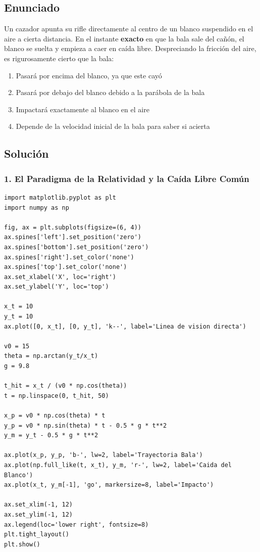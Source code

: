 \documentclass[12pt, a4paper]{article}
\begin{document}
\subsection*{Enunciado}
Un cazador apunta su rifle directamente al centro de un blanco suspendido en el aire a cierta distancia. En el instante \textbf{exacto} en que la bala sale del cañón, el blanco se suelta y empieza a caer en caída libre. Despreciando la fricción del aire, es rigurosamente cierto que la bala:
\begin{enumerate}[label=\alph*)]
    \item Pasará por encima del blanco, ya que este cayó
    \item Pasará por debajo del blanco debido a la parábola de la bala
    \item Impactará exactamente al blanco en el aire
    \item Depende de la velocidad inicial de la bala para saber si acierta
\end{enumerate}

\subsection*{Solución}

\subsubsection*{1. El Paradigma de la Relatividad y la Caída Libre Común}

\begin{verbatim}
import matplotlib.pyplot as plt
import numpy as np

fig, ax = plt.subplots(figsize=(6, 4))
ax.spines['left'].set_position('zero')
ax.spines['bottom'].set_position('zero')
ax.spines['right'].set_color('none')
ax.spines['top'].set_color('none')
ax.set_xlabel('X', loc='right')
ax.set_ylabel('Y', loc='top')

x_t = 10
y_t = 10
ax.plot([0, x_t], [0, y_t], 'k--', label='Linea de vision directa')

v0 = 15
theta = np.arctan(y_t/x_t)
g = 9.8

t_hit = x_t / (v0 * np.cos(theta))
t = np.linspace(0, t_hit, 50)

x_p = v0 * np.cos(theta) * t
y_p = v0 * np.sin(theta) * t - 0.5 * g * t**2
y_m = y_t - 0.5 * g * t**2

ax.plot(x_p, y_p, 'b-', lw=2, label='Trayectoria Bala')
ax.plot(np.full_like(t, x_t), y_m, 'r-', lw=2, label='Caida del Blanco')
ax.plot(x_t, y_m[-1], 'go', markersize=8, label='Impacto')

ax.set_xlim(-1, 12)
ax.set_ylim(-1, 12)
ax.legend(loc='lower right', fontsize=8)
plt.tight_layout()
plt.show()
\end{verbatim}
\end{document}
